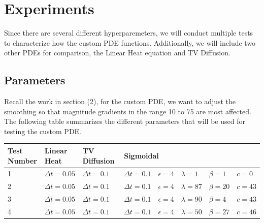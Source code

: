 \documentclass{article}
\begin{document}
  \newpage
  \section{Experiments}
  Since there are several different hyperparemeters, we will conduct
  multiple tests to characterize how the custom PDE functions.
  Additionally, we will include two other PDEs for comparison,
  the Linear Heat equation and TV Diffusion.

  \subsection{Parameters}
  Recall the work in section (2), for the custom PDE, we want to adjust the
  smoothing so that magnitude gradients in the range 10 to 75 are most affected.
  The following table summarizes the different parameters that will be used for
  testing the custom PDE.
  \begin{center}
    \begin{table}[h]
      \begin{tabular}{|l|l|ll|lllll|}
      \hline
      Test Number & Linear Heat & \multicolumn{2}{l|}{TV Diffusion} & \multicolumn{5}{l|}{Sigmoidal} \\ \hline
      1           &  $\Delta t = 0.05 $    & \multicolumn{1}{l|}{$\Delta t = 0.1$} \ $\epsilon = 4$  &    & \multicolumn{1}{l|}{$\Delta t = 0.1$} & \multicolumn{1}{l|}{$\epsilon = 4$} & \multicolumn{1}{l|}{$\lambda = 1$}  & \multicolumn{1}{l|}{$\beta = 1$}  & $c= 0$  \\ \hline
      2           &  $\Delta t = 0.05 $    & \multicolumn{1}{l|}{$\Delta t = 0.1$} \ $\epsilon = 4$  &    & \multicolumn{1}{l|}{$\Delta t = 0.1$} & \multicolumn{1}{l|}{$\epsilon = 4$} & \multicolumn{1}{l|}{$\lambda = 87$} & \multicolumn{1}{l|}{$\beta = 20$} & $c= 43$ \\ \hline
      3           &  $\Delta t = 0.05 $    & \multicolumn{1}{l|}{$\Delta t = 0.1$} \ $\epsilon = 4$  &    & \multicolumn{1}{l|}{$\Delta t = 0.1$} & \multicolumn{1}{l|}{$\epsilon = 4$} & \multicolumn{1}{l|}{$\lambda = 90$} & \multicolumn{1}{l|}{$\beta = 4$}  & $c= 43$ \\ \hline
      4           &  $\Delta t = 0.05 $    & \multicolumn{1}{l|}{$\Delta t = 0.1$} \ $\epsilon = 4$  &    & \multicolumn{1}{l|}{$\Delta t = 0.1$} & \multicolumn{1}{l|}{$\epsilon = 4$} & \multicolumn{1}{l|}{$\lambda = 50$} & \multicolumn{1}{l|}{$\beta = 27$} & $c= 46$ \\ \hline
      \end{tabular}
    \end{table}
  \end{center}
\end{document}

